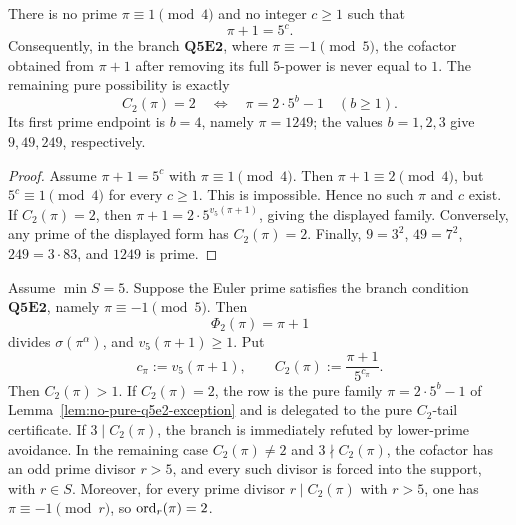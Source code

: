 \begin{lemma}
\label{lem:no-pure-q5e2-exception}
There is no prime \(\pi\equiv1\pmod4\) and no integer \(c\ge1\) such that
\[
  \pi+1=5^c.
\]
Consequently, in the branch
\(\mathbf{Q5E2}\), where \(\pi\equiv-1\pmod5\),
the cofactor obtained from \(\pi+1\) after removing its full \(5\)-power is
never equal to \(1\).  The remaining pure possibility is exactly
\[
  C_2(\pi)=2
  \quad\Longleftrightarrow\quad
  \pi=2\cdot5^b-1
  \quad(b\ge1).
\]
Its first prime endpoint is \(b=4\), namely \(\pi=1249\); the values
\(b=1,2,3\) give \(9,49,249\), respectively.
\end{lemma}

\begin{proof}
Assume \(\pi+1=5^c\) with \(\pi\equiv1\pmod4\).  Then
\(\pi+1\equiv2\pmod4\), but \(5^c\equiv1\pmod4\) for every \(c\ge1\).  This is
impossible.  Hence no such \(\pi\) and \(c\) exist.  If
\(C_2(\pi)=2\), then \(\pi+1=2\cdot5^{v_5(\pi+1)}\), giving the displayed
family.  Conversely, any prime of the displayed form has
\(C_2(\pi)=2\).  Finally, \(9=3^2\), \(49=7^2\), \(249=3\cdot83\), and
\(1249\) is prime.
\end{proof}

\begin{lemma}
\label{lem:q5e2-forced-extension}
Assume \(\min S=5\).
Suppose the Euler prime satisfies the branch condition
\(\mathbf{Q5E2}\), namely \(\pi\equiv-1\pmod5\).
Then
\[
  \Phi_2(\pi)=\pi+1
\]
divides \(\sigma(\pi^\alpha)\), and \(v_5(\pi+1)\ge1\).
Put
\[
  c_\pi:=v_5(\pi+1),
  \qquad
  C_2(\pi):=\frac{\pi+1}{5^{c_\pi}}.
\]
Then \(C_2(\pi)>1\).  If \(C_2(\pi)=2\), the row is the pure family
\(\pi=2\cdot5^b-1\) of Lemma~\ref{lem:no-pure-q5e2-exception} and is delegated
to the pure \(C_2\)-tail certificate.  If \(3\mid C_2(\pi)\), the branch is
immediately refuted by lower-prime avoidance.  In the remaining case
\(C_2(\pi)\ne2\) and \(3\nmid C_2(\pi)\), the cofactor has an odd prime divisor
\(r>5\), and every such divisor is forced into the support, with \(r\in S\).
Moreover, for every prime divisor \(r\mid C_2(\pi)\) with \(r>5\), one has
\(\pi\equiv-1\pmod r\), so \(\operatorname{ord}_r(\pi)=2\).
\end{lemma}

